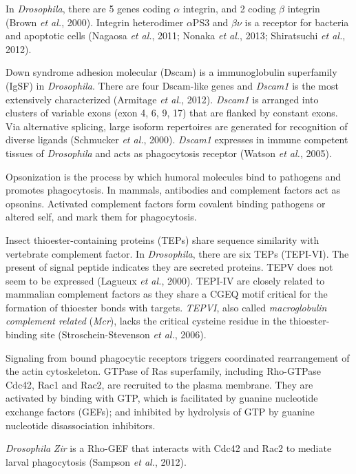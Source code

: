 \documentclass[11pt]{article}
\begin{document}
\begin{sloppypar}
In \textit{Drosophila}, there are 5 genes coding $\alpha$ integrin, and 2 coding $\beta$ integrin (Brown \textit{et al.}, 2000). 
Integrin heterodimer $\alpha$PS3 and $\beta\nu$ is a receptor for bacteria and apoptotic cells (Nagaosa \textit{et al.}, 2011; Nonaka \textit{et al.}, 2013; Shiratsuchi \textit{et al.}, 2012).
\par
Down syndrome adhesion molecular (Dscam) is a immunoglobulin superfamily (IgSF) in \textit{Drosophila}. 
There are four Dscam-like genes and \textit{Dscam1} is the most extensively characterized (Armitage \textit{et al.}, 2012). 
\textit{Dscam1} is arranged into clusters of variable exons (exon 4, 6, 9, 17) that are flanked by constant exons. 
Via alternative splicing, large isoform repertoires are generated for recognition of diverse ligands (Schmucker \textit{et al.}, 2000). 
\textit{Dscam1} expresses in immune competent tissues of \textit{Drosophila} and acts as phagocytosis receptor (Watson \textit{et al.}, 2005). 
\par
Opsonization is the process by which humoral molecules bind to pathogens and promotes phagocytosis. 
In mammals, antibodies and complement factors act as opsonins. 
Activated complement factors form covalent binding pathogens or altered self, and mark them for phagocytosis. 
\par
Insect thioester-containing proteins (TEPs) share sequence similarity with vertebrate complement factor. 
In \textit{Drosophila}, there are six TEPs (TEPI-VI). 
The present of signal peptide indicates they are secreted proteins. 
TEPV does not seem to be expressed (Lagueux \textit{et al.}, 2000). 
TEPI-IV are closely related to mammalian complement factors as they share a CGEQ motif critical for the formation of thioester bonds with targets. 
\textit{TEPVI}, also called \textit{macroglobulin complement related} (\textit{Mcr}), lacks the critical cysteine residue in the thioester-binding site (Stroschein-Stevenson \textit{et al.}, 2006). 
\par
Signaling from bound phagocytic receptors triggers coordinated rearrangement of the actin cytoskeleton. 
GTPase of Ras superfamily, including Rho-GTPase Cdc42, Rac1 and Rac2, are recruited to the plasma membrane. 
They are activated by binding with GTP, which is facilitated by guanine nucleotide exchange factors (GEFs); 
and inhibited by hydrolysis of GTP by guanine nucleotide disassociation inhibitors. 
\par
\textit{Drosophila} \textit{Zir} is a Rho-GEF that interacts with Cdc42 and Rac2 to mediate larval phagocytosis (Sampson \textit{et al.}, 2012). 

\end{sloppypar}
\end{document}

